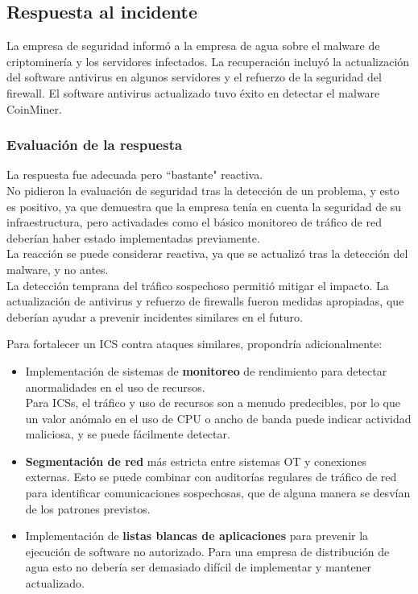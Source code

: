 \subsection{Respuesta al incidente}
La empresa de seguridad informó a la empresa de agua sobre el malware de criptominería y los servidores infectados. La recuperación incluyó la actualización del software antivirus en algunos servidores y el refuerzo de la seguridad del firewall. El software antivirus actualizado tuvo éxito en detectar el malware CoinMiner.

\subsubsection{Evaluación de la respuesta}
La respuesta fue adecuada pero ``bastante" reactiva.\\
No pidieron la evaluación de seguridad tras la detección de un problema, y esto es positivo, ya que demuestra que la empresa tenía en cuenta la seguridad de su infraestructura, pero activadades como el básico monitoreo de tráfico de red deberían haber estado implementadas previamente.\\
La reacción se puede considerar reactiva, ya que se actualizó tras la detección del malware, y no antes.\\
La detección temprana del tráfico sospechoso permitió mitigar el impacto.
La actualización de antivirus y refuerzo de firewalls fueron medidas apropiadas, que deberían ayudar a prevenir incidentes similares en el futuro.

Para fortalecer un ICS contra ataques similares, propondría adicionalmente:
\begin{itemize}
    \item Implementación de sistemas de \textbf{monitoreo} de rendimiento para detectar anormalidades en el uso de recursos.\\
        Para ICSs, el tráfico y uso de recursos son a menudo predecibles, por lo que un valor anómalo en el uso de CPU o ancho de banda puede indicar actividad maliciosa, y se puede fácilmente detectar.
        \item \textbf{Segmentación de red} más estricta entre sistemas \textsc{OT} y conexiones externas.
        Esto se puede combinar con auditorías regulares de tráfico de red para identificar comunicaciones sospechosas, que de alguna manera se desvían de los patrones previstos.
        \item Implementación de \textbf{listas blancas de aplicaciones} para prevenir la ejecución de software no autorizado.
        Para una empresa de distribución de agua esto no debería ser demasiado difícil de implementar y mantener actualizado.
\end{itemize}

